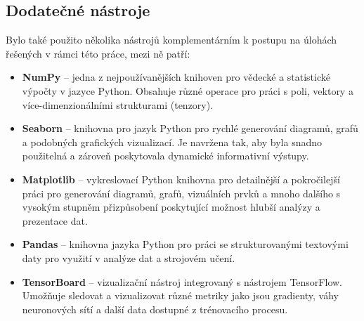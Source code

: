 \subsection{Dodatečné nástroje}
\label{sec:Chapter511}
Bylo také použito několika nástrojů komplementárním k postupu na úlohách řešených v rámci této práce, mezi ně patří:
\begin{itemize}
    \item \textbf{NumPy} -- jedna z nejpoužívanějších knihoven pro vědecké a statistické výpočty v jazyce Python. Obsahuje různé operace pro práci s poli, vektory a více-dimenzionálními strukturami (tenzory).
    \item \textbf{Seaborn} -- knihovna pro jazyk Python pro rychlé generování diagramů, grafů a podobných grafických vizualizací. Je navržena tak, aby byla snadno použitelná a zároveň poskytovala dynamické informativní výstupy.
    \item \textbf{Matplotlib} -- vykreslovací Python knihovna pro detailnější a pokročilejší práci pro generování diagramů, grafů, vizuálních prvků a mnoho dalšího s vysokým stupněm přizpůsobení poskytující možnost hlubší analýzy a prezentace dat.
    \item \textbf{Pandas} -- knihovna jazyka Python pro práci se strukturovanými textovými daty pro využití v analýze dat a strojovém učení.
    \item \textbf{TensorBoard} -- vizualizační nástroj integrovaný s nástrojem TensorFlow. Umožňuje sledovat a vizualizovat různé metriky jako jsou gradienty, váhy neuronových sítí a další data dostupné z trénovacího procesu.
\end{itemize}
\endinput